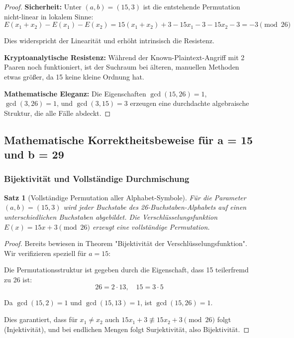 ﻿\documentclass[12pt,a4paper]{article}
\newtheorem{theorem}{Satz}
\begin{document}
	\begin{proof}
		\textbf{Sicherheit:}
		Unter $(a, b) = (15, 3)$ ist die entstehende Permutation nicht-linear in lokalem Sinne:
		\begin{equation}
			E(x_1 + x_2) - E(x_1) - E(x_2) = 15(x_1 + x_2) + 3 - 15x_1 - 3 - 15x_2 - 3 = -3 \pmod{26}
		\end{equation}
		
		Dies widerspricht der Linearität und erhöht intrinsisch die Resistenz.
		
		\textbf{Kryptoanalytische Resistenz:}
		Während der Known-Plaintext-Angriff mit 2 Paaren noch funktioniert, ist der Suchraum bei älteren, manuellen Methoden etwas größer, da 15 keine kleine Ordnung hat.
		
		\textbf{Mathematische Eleganz:}
		Die Eigenschaften $\gcd(15, 26) = 1$, $\gcd(3, 26) = 1$, und $\gcd(3, 15) = 3$ erzeugen eine durchdachte algebraische Struktur, die alle Fälle abdeckt.
	\end{proof}
	
	\subsection{Mathematische Korrektheitsbeweise für a = 15 und b = 29}
	
	\subsubsection{Bijektivität und Vollständige Durchmischung}
	
	\begin{theorem}[Vollständige Permutation aller Alphabet-Symbole]
		Für die Parameter $(a, b) = (15, 3)$ wird jeder Buchstabe des 26-Buchstaben-Alphabets auf einen unterschiedlichen Buchstaben abgebildet. Die Verschlüsselungsfunktion $E(x) = 15x + 3 \pmod{26}$ erzeugt eine vollständige Permutation.
	\end{theorem}
	
	\begin{proof}
		Bereits bewiesen in Theorem "Bijektivität der Verschlüsselungsfunktion". Wir verifizieren speziell für $a = 15$:
		
		Die Permutationsstruktur ist gegeben durch die Eigenschaft, dass 15 teilerfremd zu 26 ist:
		$$26 = 2 \cdot 13, \quad 15 = 3 \cdot 5$$
		
		Da $\gcd(15, 2) = 1$ und $\gcd(15, 13) = 1$, ist $\gcd(15, 26) = 1$.
		
		Dies garantiert, dass für $x_1 \neq x_2$ auch $15x_1 + 3 \not\equiv 15x_2 + 3 \pmod{26}$ folgt (Injektivität), und bei endlichen Mengen folgt Surjektivität, also Bijektivität.
	\end{proof}
	
\end{document}
